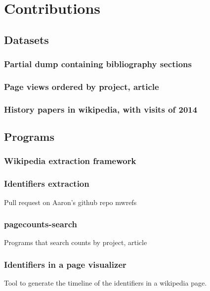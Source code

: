 
\chapter{Contributions}
\label{cha:Contributions}

\section{Datasets}
\label{sec:Datasets}

\subsection{Partial dump containing bibliography sections}
\label{sub:contrib_datasets_bibsects}


\subsection{Page views ordered by project, article}
\label{sub:contrib_datasets_pagecounts}

\subsection{History papers in wikipedia, with visits of 2014}


\section{Programs}
\label{sec:Programs}

\subsection{Wikipedia extraction framework}
\label{sub:contrib_programs_framework}


\subsection{Identifiers extraction}
\label{sub:contrib_programs_idextract}
Pull request on Aaron's github repo mwrefs


\subsection{pagecounts-search}
\label{sub:contrib_programs_pagecountssearch}
Programs that search counts by project, article

\subsection{Identifiers in a page visualizer}
Tool to generate the timeline of the identifiers in a wikipedia page.

